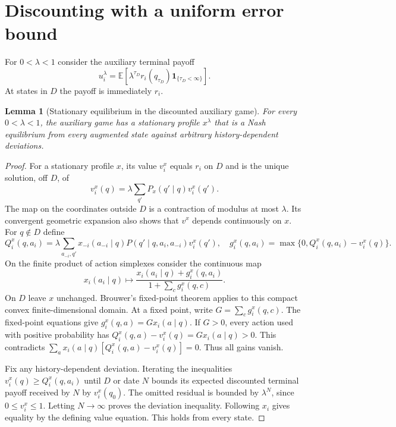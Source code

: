 \documentclass[11pt]{article}
\newtheorem{lemma}[theorem]{Lemma}
\theoremstyle{remark}\newtheorem{remark}[theorem]{Remark}
\newcommand{\E}{\mathbb E}
\begin{document}
\section*{Discounting with a uniform error bound}
For $0<\lambda<1$ consider the auxiliary terminal payoff
\[
 u_i^\lambda=\E[\lambda^{\tau_D}r_i(q_{\tau_D})\mathbf1_{\{\tau_D<\infty\}}].
\]
At states in $D$ the payoff is immediately $r_i$.

\begin{lemma}[Stationary equilibrium in the discounted auxiliary game]\label{lem:discount}
For every $0<\lambda<1$, the auxiliary game has a stationary profile $x^\lambda$ that is a Nash equilibrium from every augmented state against arbitrary history-dependent deviations.
\end{lemma}
\begin{proof}
For a stationary profile $x$, its value $v_i^x$ equals $r_i$ on $D$ and is the unique solution, off $D$, of
\[
 v_i^x(q)=\lambda\sum_{q'}P_x(q'\mid q)v_i^x(q').
\]
The map on the coordinates outside $D$ is a contraction of modulus at most $\lambda$. Its convergent geometric expansion also shows that $v^x$ depends continuously on $x$.
For $q\notin D$ define
\[
 Q_i^x(q,a_i)=\lambda\sum_{a_{-i},q'}x_{-i}(a_{-i}\mid q)
                   P(q'\mid q,a_i,a_{-i})v_i^x(q'),
 \quad g_i^x(q,a_i)=\max\{0,Q_i^x(q,a_i)-v_i^x(q)\}.
\]
On the finite product of action simplexes consider the continuous map
\[
 x_i(a_i\mid q)\longmapsto
 \frac{x_i(a_i\mid q)+g_i^x(q,a_i)}{1+\sum_c g_i^x(q,c)}.
\]
On $D$ leave $x$ unchanged. Brouwer's fixed-point theorem applies to this compact convex finite-dimensional domain. At a fixed point, write $G=\sum_cg_i^x(q,c)$. The fixed-point equations give $g_i^x(q,a)=Gx_i(a\mid q)$. If $G>0$, every action used with positive probability has
$Q_i^x(q,a)-v_i^x(q)=Gx_i(a\mid q)>0$. This contradicts
$\sum_a x_i(a\mid q)[Q_i^x(q,a)-v_i^x(q)]=0$.
Thus all gains vanish.

Fix any history-dependent deviation. Iterating the inequalities $v_i^x(q)\geq Q_i^x(q,a_i)$ until $D$ or date $N$ bounds its expected discounted terminal payoff received by $N$ by $v_i^x(q_0)$. The omitted residual is bounded by $\lambda^N$, since $0\leq v_i^x\leq1$. Letting $N\to\infty$ proves the deviation inequality. Following $x_i$ gives equality by the defining value equation. This holds from every state.
\end{proof}
\end{document}
